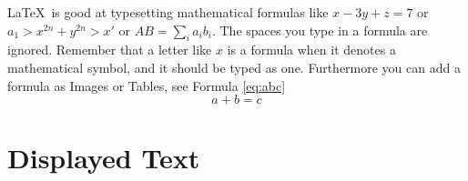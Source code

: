 \documentclass{UniVieCS_PhD}
\begin{document}
	\LaTeX\ is good at typesetting mathematical formulas
	like
	\( x-3y + z = 7 \) 
	or
	\( a_{1} > x^{2n} + y^{2n} > x' \)
	or  
	\( AB  = \sum_{i} a_{i} b_{i} \).
	The spaces you type in a formula are 
	ignored.  Remember that a letter like
	$x$                   %
	is a formula when it denotes a mathematical
	symbol, and it should be typed as one.
	Furthermore you can add a formula as Images or Tables, see Formula  \hyperref[eq:abc]{\ref{eq:abc}}
	\begin{equation}
	\label{eq:abc}
	a+b=c
	\end{equation}
	
	
	\section{Displayed Text}
	
\end{document}
